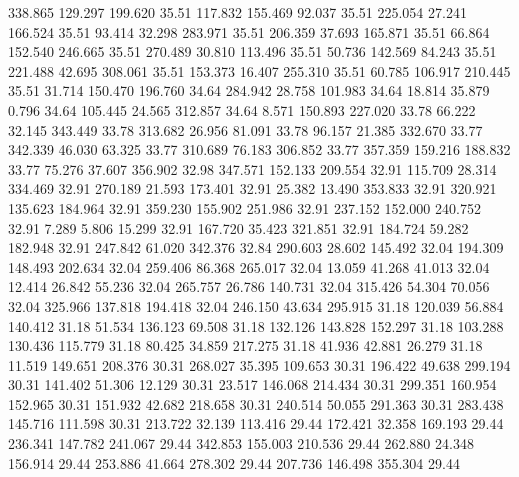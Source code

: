  338.865  129.297  199.620        35.51
 117.832  155.469   92.037        35.51
 225.054   27.241  166.524        35.51
  93.414   32.298  283.971        35.51
 206.359   37.693  165.871        35.51
  66.864  152.540  246.665        35.51
 270.489   30.810  113.496        35.51
  50.736  142.569   84.243        35.51
 221.488   42.695  308.061        35.51
 153.373   16.407  255.310        35.51
  60.785  106.917  210.445        35.51
  31.714  150.470  196.760        34.64
 284.942   28.758  101.983        34.64
  18.814   35.879    0.796        34.64
 105.445   24.565  312.857        34.64
   8.571  150.893  227.020        33.78
  66.222   32.145  343.449        33.78
 313.682   26.956   81.091        33.78
  96.157   21.385  332.670        33.77
 342.339   46.030   63.325        33.77
 310.689   76.183  306.852        33.77
 357.359  159.216  188.832        33.77
  75.276   37.607  356.902        32.98
 347.571  152.133  209.554        32.91
 115.709   28.314  334.469        32.91
 270.189   21.593  173.401        32.91
  25.382   13.490  353.833        32.91
 320.921  135.623  184.964        32.91
 359.230  155.902  251.986        32.91
 237.152  152.000  240.752        32.91
   7.289    5.806   15.299        32.91
 167.720   35.423  321.851        32.91
 184.724   59.282  182.948        32.91
 247.842   61.020  342.376        32.84
 290.603   28.602  145.492        32.04
 194.309  148.493  202.634        32.04
 259.406   86.368  265.017        32.04
  13.059   41.268   41.013        32.04
  12.414   26.842   55.236        32.04
 265.757   26.786  140.731        32.04
 315.426   54.304   70.056        32.04
 325.966  137.818  194.418        32.04
 246.150   43.634  295.915        31.18
 120.039   56.884  140.412        31.18
  51.534  136.123   69.508        31.18
 132.126  143.828  152.297        31.18
 103.288  130.436  115.779        31.18
  80.425   34.859  217.275        31.18
  41.936   42.881   26.279        31.18
  11.519  149.651  208.376        30.31
 268.027   35.395  109.653        30.31
 196.422   49.638  299.194        30.31
 141.402   51.306   12.129        30.31
  23.517  146.068  214.434        30.31
 299.351  160.954  152.965        30.31
 151.932   42.682  218.658        30.31
 240.514   50.055  291.363        30.31
 283.438  145.716  111.598        30.31
 213.722   32.139  113.416        29.44
 172.421   32.358  169.193        29.44
 236.341  147.782  241.067        29.44
 342.853  155.003  210.536        29.44
 262.880   24.348  156.914        29.44
 253.886   41.664  278.302        29.44
 207.736  146.498  355.304        29.44
